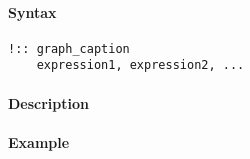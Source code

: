 


	\paragraph{Syntax}

\begin{verbatim}
!:: graph_caption
    expression1, expression2, ...
\end{verbatim}

\paragraph{Description}

\paragraph{Example}


